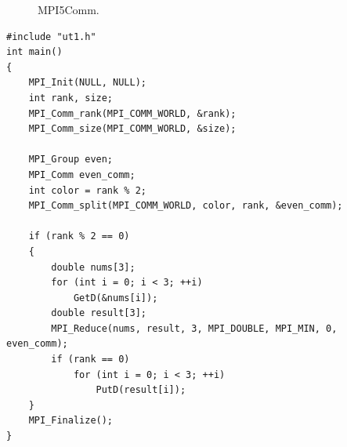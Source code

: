 \begin{figure}[htbp]%
    \centering
    \hfill%
    \caption{MPI5Comm.}%
    \label{mpi5comm}%
\end{figure}

\lstset{language=c++}
\begin{lstlisting}
#include "ut1.h"
int main()
{
	MPI_Init(NULL, NULL);
	int rank, size;
	MPI_Comm_rank(MPI_COMM_WORLD, &rank);
	MPI_Comm_size(MPI_COMM_WORLD, &size);

	MPI_Group even;
	MPI_Comm even_comm;
	int color = rank % 2;
	MPI_Comm_split(MPI_COMM_WORLD, color, rank, &even_comm);

	if (rank % 2 == 0)
	{
		double nums[3];
		for (int i = 0; i < 3; ++i)
			GetD(&nums[i]);
		double result[3];
		MPI_Reduce(nums, result, 3, MPI_DOUBLE, MPI_MIN, 0, even_comm);
		if (rank == 0)
			for (int i = 0; i < 3; ++i)
				PutD(result[i]);
	}
	MPI_Finalize();
}
\end{lstlisting}

